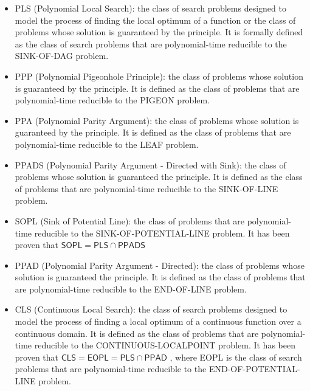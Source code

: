 \begin{itemize}
    \item \textsf{PLS} (Polynomial Local Search): the class of search problems designed to model the process of finding the local optimum of a function or the class of problems whose solution is guaranteed by the  principle. It is formally defined as the class of search problems that are polynomial-time reducible to the SINK-OF-DAG problem.
    
    \item \textsf{PPP} (Polynomial Pigeonhole Principle): the class of problems whose solution is guaranteed by the  principle. It is defined as the class of problems that are polynomial-time reducible to the PIGEON problem.
    
    \item \textsf{PPA} (Polynomial Parity Argument): the class of problems whose solution is guaranteed by the  principle. It is defined as the class of problems that are polynomial-time reducible to the LEAF problem.
    
    \item \textsf{PPADS} (Polynomial Parity Argument - Directed with Sink): the class of problems whose solution is guaranteed the  principle. It is defined as the class of problems that are polynomial-time reducible to the SINK-OF-LINE problem.
    
    \item \textsf{SOPL} (Sink of Potential Line): the class of problems that are polynomial-time reducible to the SINK-OF-POTENTIAL-LINE problem. It has been proven that $\mathsf{SOPL} = \mathsf{PLS} \cap \mathsf{PPADS}$ \cite{Further_collapses_TFNP}
    
    \item \textsf{PPAD} (Polynomial Parity Argument - Directed): the class of problems whose solution is guaranteed the  principle. It is defined as the class of problems that are polynomial-time reducible to the END-OF-LINE problem.
    
    \item \textsf{CLS} (Continuous Local Search): the class of search problems designed to model the process of finding a local optimum of a continuous function over a continuous domain. It is defined as the class of problems that are polynomial-time reducible to the CONTINUOUS-LOCALPOINT problem. It has been proven that $\mathsf{CLS} = \mathsf{EOPL} = \mathsf{PLS} \cap \mathsf{PPAD}$ \cite{gradient_descent, Further_collapses_TFNP}, where \textsf{EOPL} is the class of search problems that are polynomial-time reducible to the END-OF-POTENTIAL-LINE problem.
\end{itemize}


